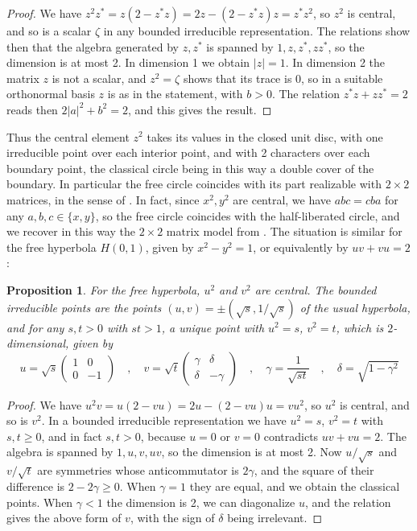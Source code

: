 \documentclass[11pt]{amsart}
\newtheorem{proposition}[theorem]{Proposition}
\theoremstyle{definition}
\begin{document}
\begin{proof}
We have $z^2z^*=z(2-z^*z)=2z-(2-z^*z)z=z^*z^2$, so $z^2$ is central, and so is a scalar $\zeta$ in any bounded irreducible representation. The relations show then that the algebra generated by $z,z^*$ is spanned by $1,z,z^*,zz^*$, so the dimension is at most 2. In dimension 1 we obtain $|z|=1$. In dimension 2 the matrix $z$ is not a scalar, and $z^2=\zeta$ shows that its trace is 0, so in a suitable orthonormal basis $z$ is as in the statement, with $b>0$. The relation $z^*z+zz^*=2$ reads then $2|a|^2+b^2=2$, and this gives the result.
\end{proof}

Thus the central element $z^2$ takes its values in the closed unit disc, with one irreducible point over each interior point, and with 2 characters over each boundary point, the classical circle being in this way a double cover of the boundary. In particular the free circle coincides with its part realizable with $2\times2$ matrices, in the sense of \cite{bbi}. In fact, since $x^2,y^2$ are central, we have $abc=cba$ for any $a,b,c\in\{x,y\}$, so the free circle coincides with the half-liberated circle, and we recover in this way the $2\times2$ matrix model from \cite{bi2}. The situation is similar for the free hyperbola $H(0,1)$, given by $x^2-y^2=1$, or equivalently by $uv+vu=2$:

\begin{proposition}\label{p42}
For the free hyperbola, $u^2$ and $v^2$ are central. The bounded irreducible points are the points $(u,v)=\pm(\sqrt s,1/\sqrt s)$ of the usual hyperbola, and for any $s,t>0$ with $st>1$, a unique point with $u^2=s$, $v^2=t$, which is $2$-dimensional, given by
$$u=\sqrt s\begin{pmatrix}1&0\\0&-1\end{pmatrix}\quad,\quad v=\sqrt t\begin{pmatrix}\gamma&\delta\\ \delta&-\gamma\end{pmatrix}\quad,\quad\gamma=\frac{1}{\sqrt{st}}\quad,\quad\delta=\sqrt{1-\gamma^2}$$
\end{proposition}

\begin{proof}
We have $u^2v=u(2-vu)=2u-(2-vu)u=vu^2$, so $u^2$ is central, and so is $v^2$. In a bounded irreducible representation we have $u^2=s$, $v^2=t$ with $s,t\geq0$, and in fact $s,t>0$, because $u=0$ or $v=0$ contradicts $uv+vu=2$. The algebra is spanned by $1,u,v,uv$, so the dimension is at most 2. Now $u/\sqrt s$ and $v/\sqrt t$ are symmetries whose anticommutator is $2\gamma$, and the square of their difference is $2-2\gamma\geq0$. When $\gamma=1$ they are equal, and we obtain the classical points. When $\gamma<1$ the dimension is 2, we can diagonalize $u$, and the relation gives the above form of $v$, with the sign of $\delta$ being irrelevant.
\end{proof}
\end{document}
